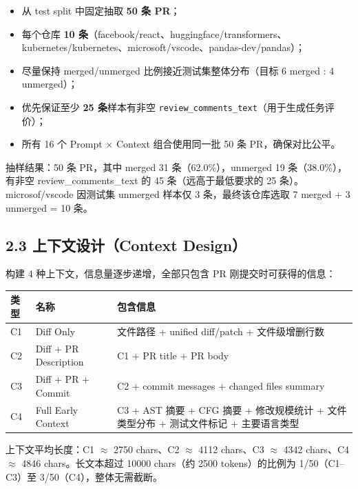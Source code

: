 \documentclass{experimentreport}
\begin{document}
{\begin{itemize}
    \item 从 test split 中固定抽取 \textbf{50 条 PR}；
    \item 每个仓库 \textbf{10 条}（facebook/react、huggingface/transformers、kubernetes/kubernetes、microsoft/vscode、pandas-dev/pandas）；
    \item 尽量保持 merged/unmerged 比例接近测试集整体分布（目标 6 merged : 4 unmerged）；
    \item 优先保证至少 \textbf{25 条}样本有非空 \texttt{review\_comments\_text}（用于生成任务评价）；
    \item 所有 16 个 Prompt $\times$ Context 组合使用同一批 50 条 PR，确保对比公平。
\end{itemize}

抽样结果：50 条 PR，其中 merged 31 条（62.0\%），unmerged 19 条（38.0\%），有非空 review\_comments\_text 的 45 条（远高于最低要求的 25 条）。microsof/vscode 因测试集 unmerged 样本仅 3 条，最终该仓库选取 7 merged + 3 unmerged = 10 条。

\subsection*{2.3 上下文设计（Context Design）}

构建 4 种上下文，信息量逐步递增，全部只包含 PR 刚提交时可获得的信息：

\begin{center}
\begin{tabular}{|l|l|p{7cm}|}
\hline
\textbf{类型} & \textbf{名称} & \textbf{包含信息} \\
\hline
C1 & Diff Only & 文件路径 + unified diff/patch + 文件级增删行数 \\
\hline
C2 & Diff + PR Description & C1 + PR title + PR body \\
\hline
C3 & Diff + PR + Commit & C2 + commit messages + changed files summary \\
\hline
C4 & Full Early Context & C3 + AST 摘要 + CFG 摘要 + 修改规模统计 + 文件类型分布 + 测试文件标记 + 主要语言类型 \\
\hline
\end{tabular}
\end{center}

上下文平均长度：C1 $\approx$ 2750 chars、C2 $\approx$ 4112 chars、C3 $\approx$ 4342 chars、C4 $\approx$ 4846 chars。长文本超过 10000 chars（约 2500 tokens）的比例为 1/50（C1--C3）至 3/50（C4），整体无需截断。

}
\end{document}
